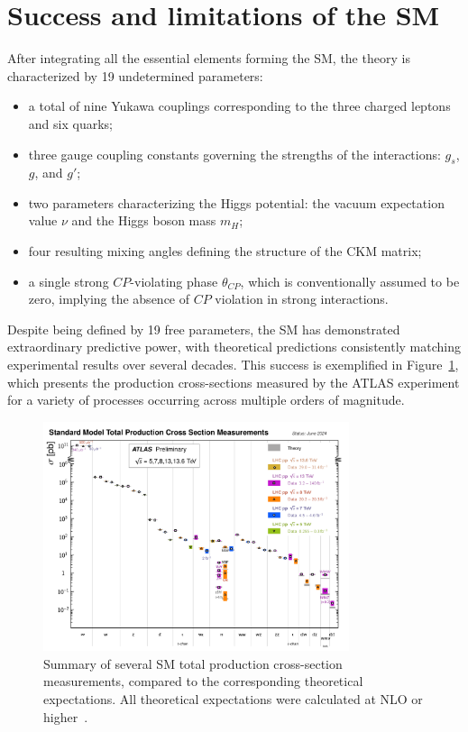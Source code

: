 \section{Success and limitations of the SM}
\label{sec:BSM}
After integrating all the essential elements forming the SM, the theory is characterized by 19 undetermined parameters:
\begin{itemize}
  \item a total of nine Yukawa couplings corresponding to the three charged leptons and six quarks;
  \item three gauge coupling constants governing the strengths of the interactions: \( g_s \), \( g \), and \( g' \);
  \item two parameters characterizing the Higgs potential: the vacuum expectation value \(\nu\) and the Higgs boson mass \(m_H\);
  \item four resulting mixing angles defining the structure of the CKM matrix;
  \item a single strong $CP$-violating phase \(\theta_{CP}\), which is conventionally assumed to be zero, implying the absence of $CP$ violation in strong interactions.
\end{itemize}
Despite being defined by 19 free parameters, the SM has demonstrated extraordinary predictive power, with theoretical predictions consistently matching experimental results over several decades. This success is exemplified in Figure~\ref{fig:totalxsect}, which presents the production cross-sections measured by the ATLAS experiment for a variety of processes occurring across multiple orders of magnitude.
\begin{figure}[htbp]
  \centering
  \includegraphics[width=0.8\textwidth]{images/totalxsect.pdf}
  \caption{Summary of several SM total production cross-section measurements, compared to the corresponding theoretical expectations. All theoretical expectations were calculated at NLO or higher~\cite{ATL-PHYS-PUB-2024-011}.}
  \label{fig:totalxsect}
\end{figure}

